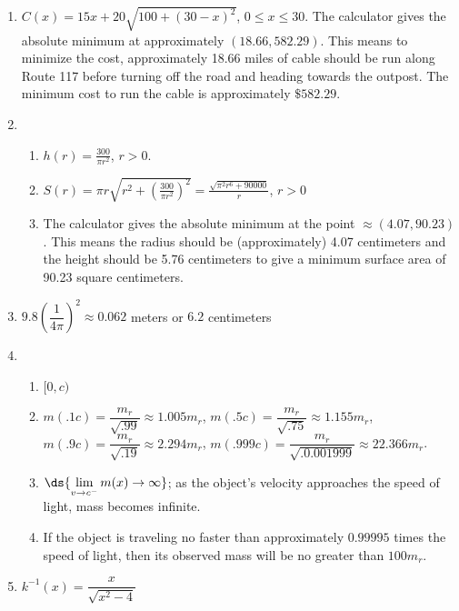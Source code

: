 \documentclass{ximera}
\begin{document}
\begin{enumerate}
\setcounter{enumi}{\value{HW}}

\item $C(x) = 15x+20\sqrt{100+(30-x)^2}$, $0 \leq x \leq 30$.  The calculator gives the absolute minimum at approximately $(18.66, 582.29)$.  This means to minimize the cost, approximately 18.66 miles of cable should be run along Route 117 before turning off the road and heading towards the outpost.  The minimum cost to run the cable is approximately $\$582.29$.



\item 

\begin{enumerate}
\item  $h(r) = \frac{300}{\pi r^2}$, $r > 0$.
\item  $S(r) = \pi r \sqrt{r^2+\left(\frac{300}{\pi r^2}\right)^2} = \frac{\sqrt{\pi^2 r^6+90000}}{r}$, $r>0$
\item  The calculator gives the absolute minimum at the point $\approx (4.07, 90.23)$.  This means the radius should be (approximately) 4.07 centimeters and the height should be 5.76 centimeters to give a minimum surface area of 90.23 square centimeters.


\end{enumerate}


\item $9.8 \left(\dfrac{1}{4\pi}\right)^{2} \approx 0.062$ meters or $6.2$ centimeters

\item \begin{enumerate}

\item $[0, c)$

\item $m(.1c) = \dfrac{m_{r}}{\sqrt{.99}} \approx 1.005m_{r}$,  $m(.5c) = \dfrac{m_{r}}{\sqrt{.75}} \approx 1.155m_{r}$,  $m(.9c) = \dfrac{m_{r}}{\sqrt{.19}} \approx 2.294m_{r}$, $m(.999c) = \dfrac{m_{r}}{\sqrt{.0.001999}} \approx 22.366m_{r}$.

\item $\ds{\lim_{v \rightarrow c^{-}} m(x) \rightarrow \infty}$;   as the object's velocity approaches the speed of light, mass becomes infinite.

\item If the object is traveling no faster than approximately $0.99995$ times the speed of light, then its observed mass will be no greater than $100m_{r}$.

\end{enumerate}


\item $k^{-1}(x) = \dfrac{x}{\sqrt{x^{2} - 4}}$



\end{enumerate}
\end{document}
